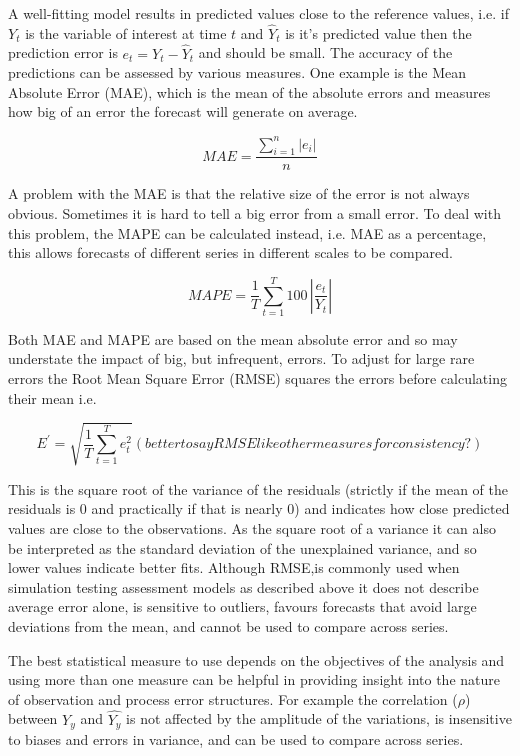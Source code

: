 A well-fitting model results in predicted values close to the reference values, i.e. if $Y_t$ is the variable of interest at time $t$ and ${\hat{Y}_t}$ is it's predicted value then the prediction error is $e_t = Y_t - \hat{Y}_t$ and should be small. The accuracy of the predictions can be assessed by various measures. One example is the Mean Absolute Error (MAE), which is the mean of the absolute errors and measures how big of an error the forecast will generate on average.

\begin{equation} 
{MAE} =\frac{\sum_{i=1}^{n}\left|e_{i}\right|}{n}
\end{equation} 
 
A problem with the MAE is that the relative size of the error is not always obvious. Sometimes it is hard to tell a big error from a small error. To deal with this problem, the MAPE can be calculated instead, i.e. MAE as a percentage, this allows forecasts of different series in different scales to be compared.

\begin{equation} 
{MAPE = \frac{1}{T} \sum_{t=1}^T 100\, \left|\frac{e_t}{Y_t}\right|} 
\end{equation}

Both MAE and MAPE are based on the mean absolute error and so may understate the impact of big, but infrequent, errors.  To adjust for large rare errors the Root Mean Square Error (RMSE) squares the errors before calculating their mean i.e.
     
\begin{equation} 
{E^{\prime} = \sqrt{\frac{1}{T} \sum_{t=1}^T e_t^2}} 
(better to say RMSE like other measures for consistency?)
\end{equation}

This is the square root of the variance of the residuals (strictly if the mean of the residuals is 0 and practically if that is nearly 0) and indicates how close predicted values are close to the observations. As the square root of a variance it can also be interpreted as the standard deviation of the unexplained variance, and so lower values indicate better fits. Although RMSE,is commonly used when simulation testing assessment models \citep[e.g.][]{horbowy2011comparison} as described above it does not describe average error alone, is sensitive to outliers, favours forecasts that avoid large deviations from the mean, and cannot be used to compare across series.

The best statistical measure to use depends on the objectives of the analysis and using more than one measure can be helpful in providing insight into the nature of observation and process error structures. For example the correlation ($\rho$) between $Y_y$ and $\hat{Y_y}$ is not affected by the amplitude of the variations, is insensitive to biases and errors in variance, and can be used to compare across series.

